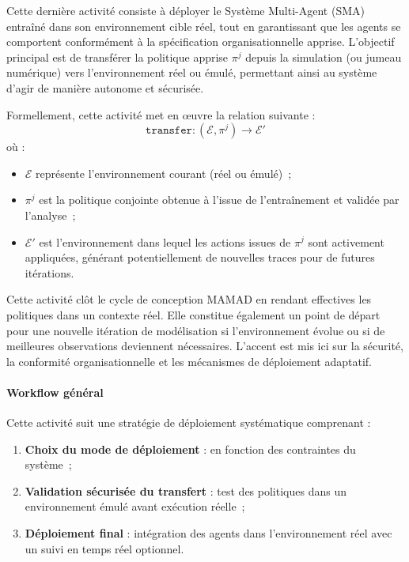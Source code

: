 Cette dernière activité consiste à déployer le Système Multi-Agent (SMA) entraîné dans son environnement cible réel, tout en garantissant que les agents se comportent conformément à la spécification organisationnelle apprise. L'objectif principal est de transférer la politique apprise $\pi^j$ depuis la simulation (ou jumeau numérique) vers l'environnement réel ou émulé, permettant ainsi au système d'agir de manière autonome et sécurisée.

Formellement, cette activité met en œuvre la relation suivante :
\[
    \texttt{transfer}: \left( \mathcal{E}, \pi^j \right) \longrightarrow \mathcal{E}'
\]
où :
\begin{itemize}
    \item $\mathcal{E}$ représente l'environnement courant (réel ou émulé)~;
    \item $\pi^j$ est la politique conjointe obtenue à l'issue de l'entraînement et validée par l'analyse~;
    \item $\mathcal{E}'$ est l'environnement dans lequel les actions issues de $\pi^j$ sont activement appliquées, générant potentiellement de nouvelles traces pour de futures itérations.
\end{itemize}

Cette activité clôt le cycle de conception MAMAD en rendant effectives les politiques dans un contexte réel. Elle constitue également un point de départ pour une nouvelle itération de modélisation si l'environnement évolue ou si de meilleures observations deviennent nécessaires. L'accent est mis ici sur la sécurité, la conformité organisationnelle et les mécanismes de déploiement adaptatif.

\paragraph{Workflow général}

Cette activité suit une stratégie de déploiement systématique comprenant :
\begin{enumerate}
    \item \textbf{Choix du mode de déploiement} : en fonction des contraintes du système~;
    \item \textbf{Validation sécurisée du transfert} : test des politiques dans un environnement émulé avant exécution réelle~;
    \item \textbf{Déploiement final} : intégration des agents dans l'environnement réel avec un suivi en temps réel optionnel.
\end{enumerate}

